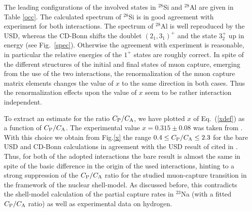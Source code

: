 \begin{multicols}{2}
The leading configurations of the involved states in $^{28}$Si and $^{28}$Al
are given in Table \ref{occ}.
The calculated spectrum of $^{28}$Si is in good agreement with experiment for
both interactions. The spectrum of $^{28}$Al is well reproduced by the USD,
whereas the CD-Bonn shifts the doublet $(2_1,3_1)^+$ and the state $3^+_2$ up
in energy (see Fig.\ \ref{spec}). Otherwise the agreement with experiment is
reasonable, in particular the relative energies of the $1^+$ states are roughly
correct.
In spite of the different structures of the initial and final states of muon
capture, emerging from the use of the two interactions, the renormalization
of the muon capture matrix elements changes the value of $x$ to the same
direction in both cases. Thus the renormalization effects upon the value of
$x$ seem to be rather interaction independent.

To extract an estimate for the ratio $C_{\rm P}/C_{\rm A}$, we have
plotted $x$ of Eq.\ (\ref{xdef}) as a function of $C_{\rm P}/C_{\rm A}$. The
experimental value $x=0.315\pm0.08$ was taken
from \cite{MOF97}. With this choice  we obtain from Fig.\thinspace \ref{x}
the range $0.4\le C_{\rm P}/C_{\rm A}\le 2.3$
for the bare USD and CD-Bonn calculations
in agreement with the USD result of \cite{JUN95} cited in \cite{MOF97}. Thus,
for both of the adopted interactions the bare result is almost the
same in spite of the basic difference in the origin
of the used interactions, hinting to a strong
suppression of the $C_{\rm P}/C_{\rm A}$ ratio for the studied
muon-capture transition in the framework of the nuclear shell-model.
As discussed before, this contradicts the
shell-model calculation of the partial capture rates in
$^{23}$Na (with a fitted $C_{\rm P}/C_{\rm A}$ ratio)
as well as experimental data on hydrogen.


\end{multicols}
